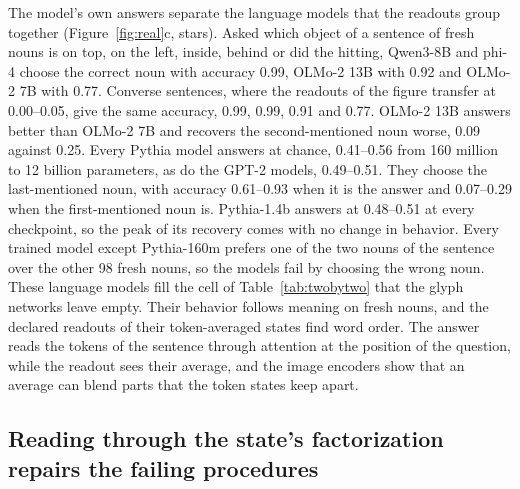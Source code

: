 \documentclass[10pt]{article}
\theoremstyle{plain}
\theoremstyle{remark}
\begin{document}
The model's own answers separate the language models that the readouts group together (Figure~\ref{fig:real}c, stars). Asked which object of a sentence of fresh nouns is on top, on the left, inside, behind or did the hitting, Qwen3-8B and phi-4 choose the correct noun with accuracy 0.99, OLMo-2 13B with 0.92 and OLMo-2 7B with 0.77. Converse sentences, where the readouts of the figure transfer at 0.00--0.05, give the same accuracy, 0.99, 0.99, 0.91 and 0.77. OLMo-2 13B answers better than OLMo-2 7B and recovers the second-mentioned noun worse, 0.09 against 0.25. Every Pythia model answers at chance, 0.41--0.56 from 160 million to 12 billion parameters, as do the GPT-2 models, 0.49--0.51. They choose the last-mentioned noun, with accuracy 0.61--0.93 when it is the answer and 0.07--0.29 when the first-mentioned noun is. Pythia-1.4b answers at 0.48--0.51 at every checkpoint, so the peak of its recovery comes with no change in behavior. Every trained model except Pythia-160m prefers one of the two nouns of the sentence over the other 98 fresh nouns, so the models fail by choosing the wrong noun. These language models fill the cell of Table~\ref{tab:twobytwo} that the glyph networks leave empty. Their behavior follows meaning on fresh nouns, and the declared readouts of their token-averaged states find word order. The answer reads the tokens of the sentence through attention at the position of the question, while the readout sees their average, and the image encoders show that an average can blend parts that the token states keep apart.

\subsection{Reading through the state's factorization repairs the failing procedures}
\label{sec:remedies}
\end{document}
